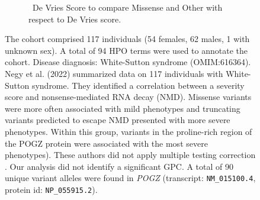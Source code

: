 \begin{figure}[htbp]
\vspace{2em}

\begin{subfigure}[b]{0.95\textwidth}
\captionsetup{justification=raggedright,singlelinecheck=false}
\caption{ De Vries Score to compare Missense and Other with respect to De Vries score. }
\end{subfigure}

\vspace{2em}

\caption{ The cohort comprised 117 individuals (54 females, 62 males, 1 with unknown sex). A total of 94 HPO terms were used to annotate the cohort. Disease diagnosis: White-Sutton syndrome (OMIM:616364). Negy et al. (2022) summarized data on 117 individuals with White-Sutton syndrome. They identified a correlation 
between a severity score and nonsense-mediated RNA decay (NMD). Missense variants were more often associated with mild phenotypes 
and truncating variants predicted to escape NMD presented with more severe phenotypes. Within this group, variants in the 
proline-rich region of the POGZ protein were associated with the most severe phenotypes).
 These authors did not apply multiple testing correction \cite{PMID_35052493}.
Our analysis did not identify a significant GPC. A total of 90 unique variant alleles were found in \textit{POGZ} (transcript: \texttt{NM\_015100.4}, protein id: \texttt{NP\_055915.2}).}
\end{figure}
